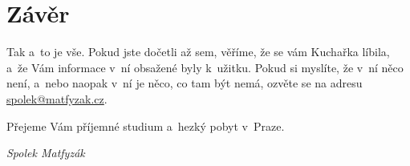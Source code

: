 \section{Závěr}
Tak a~to je vše. Pokud jste dočetli až sem, věříme, že se vám
Kuchařka líbila, a~že Vám informace v~ní obsažené byly k~užitku.
Pokud si myslíte, že v~ní něco není, a~nebo naopak v~ní je něco,
co tam být nemá, ozvěte se na adresu \url{spolek@matfyzak.cz}.

\medskip

Přejeme Vám příjemné studium a~hezký pobyt v~Praze.

\hskip 8cm \it Spolek Matfyzák